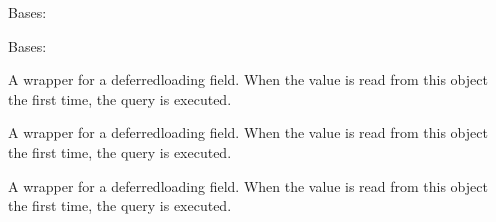 \documentclass[letterpaper,10pt,spanish]{sphinxmanual}
\begin{document}
\begin{fulllineitems}
\begin{description}
\end{description}


\begin{fulllineitems}

\pysigstartsignatures
{}
\pysigstopsignatures
\sphinxAtStartPar
Bases: 

\end{fulllineitems}



\begin{fulllineitems}

\pysigstartsignatures
{}
\pysigstopsignatures
\sphinxAtStartPar
Bases: 

\end{fulllineitems}



\begin{fulllineitems}

\pysigstartsignatures
{}
\pysigstopsignatures
\sphinxAtStartPar
A wrapper for a deferred\sphinxhyphen{}loading field. When the value is read from this
object the first time, the query is executed.

\end{fulllineitems}



\begin{fulllineitems}

\pysigstartsignatures
{}
\pysigstopsignatures
\sphinxAtStartPar
A wrapper for a deferred\sphinxhyphen{}loading field. When the value is read from this
object the first time, the query is executed.

\end{fulllineitems}



\begin{fulllineitems}

\pysigstartsignatures
{}
\pysigstopsignatures
\sphinxAtStartPar
A wrapper for a deferred\sphinxhyphen{}loading field. When the value is read from this
object the first time, the query is executed.


\end{fulllineitems}
\end{fulllineitems}
\end{document}
